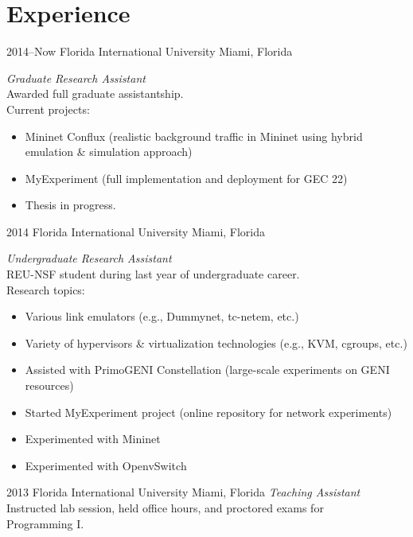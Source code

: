 \documentclass[]{friggeri-cv} %
\begin{document}

\section{Experience}

\begin{entrylist}
\entry
{2014--Now}
{Florida International University}
{Miami, Florida}
{\emph{Graduate Research Assistant} \\
Awarded full graduate assistantship. \\
Current projects:
\begin{itemize}
    \item Mininet Conflux (realistic background traffic in Mininet using hybrid 
        \\emulation \& simulation approach)
    \item MyExperiment (full implementation and deployment for GEC 22)
    \item Thesis in progress.
\end{itemize}}
\entry
{2014}
{Florida International University}
{Miami, Florida}
{\emph{Undergraduate Research Assistant} \\
REU-NSF student during last year of undergraduate career.\\
Research topics:
\begin{itemize}
    \item Various link emulators (e.g., Dummynet, tc-netem, etc.)
    \item Variety of hypervisors \& virtualization technologies (e.g., KVM, cgroups, etc.)
    \item Assisted with PrimoGENI Constellation (large-scale experiments on GENI resources)
    \item Started MyExperiment project (online repository for network experiments)
    \item Experimented with Mininet
    \item Experimented with OpenvSwitch
\end{itemize}}
\entry
{2013}
{Florida International University}
{Miami, Florida}
{\emph{Teaching Assistant} \\
Instructed lab session, held office hours, and proctored exams for \\Programming I.}
\end{entrylist}
\end{document}
